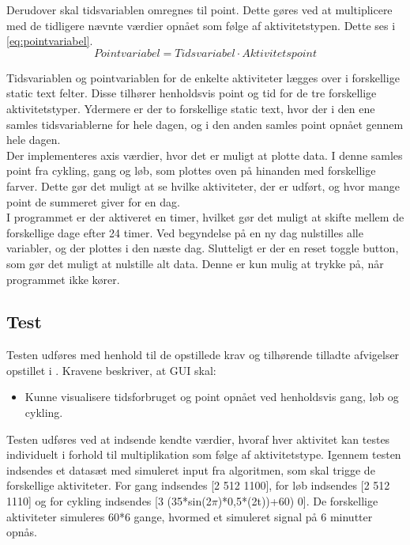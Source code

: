 Derudover skal tidsvariablen omregnes til point. Dette gøres ved at multiplicere med de tidligere nævnte værdier opnået som følge af aktivitetstypen. Dette ses i \eqref{eq:pointvariabel}. 
\begin{equation}
Pointvariabel = Tidsvariabel \cdot Aktivitetspoint
\label{eq:pointvariabel}
\end{equation}

Tidsvariablen og pointvariablen for de enkelte aktiviteter lægges over i forskellige static text felter. Disse tilhører henholdsvis point og tid for de tre forskellige aktivitetstyper. Ydermere er der to forskellige static text, hvor der i den ene samles tidsvariablerne for hele dagen, og i den anden samles point opnået gennem hele dagen. \\
Der implementeres axis værdier, hvor det er muligt at plotte data. I denne samles point fra cykling, gang og løb, som plottes oven på hinanden med forskellige farver. Dette gør det muligt at se hvilke aktiviteter, der er udført, og hvor mange point de summeret giver for en dag. \\
I programmet er der aktiveret en timer, hvilket gør det muligt at skifte mellem de forskellige dage efter 24 timer. Ved begyndelse på en ny dag nulstilles alle variabler, og der plottes i den næste dag. Slutteligt er der en reset toggle button, som gør det muligt at nulstille alt data. Denne er kun mulig at trykke på, når programmet ikke kører. 

\subsection{Test}
Testen udføres med henhold til de opstillede krav og tilhørende tilladte afvigelser opstillet i . Kravene beskriver, at GUI skal:
\begin{itemize}
	\item Kunne visualisere tidsforbruget og point opnået ved henholdsvis gang, løb og cykling. 
\end{itemize}

Testen udføres ved at indsende kendte værdier, hvoraf hver aktivitet kan testes individuelt i forhold til multiplikation som følge af aktivitetstype.
Igennem testen indsendes et datasæt med simuleret input fra algoritmen, som skal trigge de forskellige aktiviteter. For gang indsendes [2 512 1100], for løb indsendes [2 512 1110] og for cykling indsendes [3 (35*sin(2$\pi$)*0,5*(2t))+60) 0]. De forskellige aktiviteter simuleres 60*6 gange, hvormed et simuleret signal på 6 minutter opnås.

